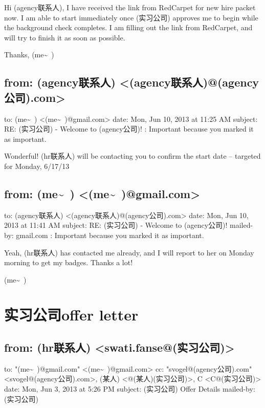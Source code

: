 \documentclass[12pt]{book}
\begin{document}
Hi (agency联系人),
I have received the link from RedCarpet for new hire packet now. I am able to start immediately once (实习公司) approves me to begin while the background check completes.
I am filling out the link from RedCarpet, and will try to finish it as soon as possible.

Thanks,
(me\textasciitilde{}~)


\section{from:         (agency联系人) <(agency联系人)@(agency公司).com>}
\label{sec-39-17}
to:         (me\textasciitilde{}~) <(me\textasciitilde{}~)@gmail.com>
date:         Mon, Jun 10, 2013 at 11:25 AM
subject:         RE: (实习公司) - Welcome to (agency公司)!
:         Important because you marked it as important.

Wonderful! (hr联系人) will be contacting you to confirm the start date -- targeted for Monday, 6/17/13 


\section{from:         (me\textasciitilde{}~) <(me\textasciitilde{}~)@gmail.com>}
\label{sec-39-18}
to:         (agency联系人) <(agency联系人)@(agency公司).com>
date:         Mon, Jun 10, 2013 at 11:41 AM
subject:         RE: (实习公司) - Welcome to (agency公司)!
mailed-by:         gmail.com
:         Important because you marked it as important.

Yeah, (hr联系人) has contacted me already, and I will report to her on Monday morning to get my badges. Thanks a lot!

(me\textasciitilde{}~)

\chapter{实习公司offer letter}
\label{sec-40}

\section{from:         (hr联系人) <swati.fanse@(实习公司)>}
\label{sec-40-1}
to:         "(me\textasciitilde{}~)@gmail.com" <(me\textasciitilde{}~)@gmail.com>
cc:         "svogel@(agency公司).com" <svogel@(agency公司).com>,
 (某人) <@(某人)(实习公司)>,
 C <C@(实习公司)>
date:         Mon, Jun 3, 2013 at 5:26 PM
subject:         (实习公司) Offer Details
mailed-by:         (实习公司)
\end{document}
